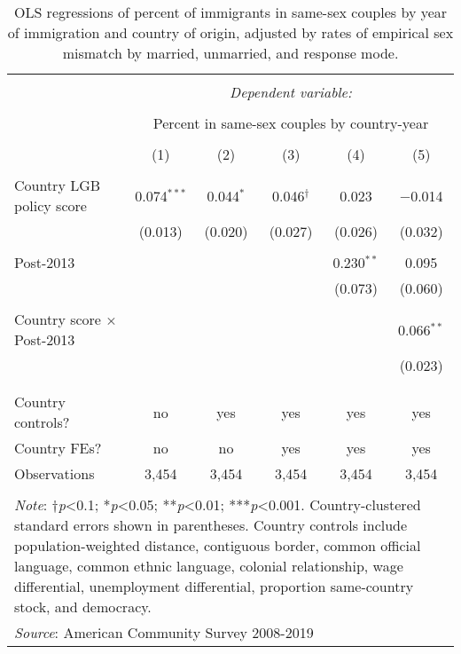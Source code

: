 \documentclass[
  11pt,
]{article}
\begin{document}
\begin{table}[H] \centering 
  \caption{OLS regressions of percent of immigrants in same-sex couples by year of immigration and country of origin, adjusted by rates of empirical sex mismatch by married, unmarried, and response mode. } 
  \label{tab:country-props-adj} 
\begin{tabular}{@{\extracolsep{5pt}}lccccc} 
\\[-1.8ex]\hline 
\hline \\[-1.8ex] 
 & \multicolumn{5}{c}{\textit{Dependent variable:}} \\ 
\cline{2-6} 
\\[-1.8ex] & \multicolumn{5}{c}{Percent in same-sex couples by country-year} \\ 
\\[-1.8ex] & (1) & (2) & (3) & (4) & (5)\\ 
\hline \\[-1.8ex] 
 Country LGB policy score & 0.074$^{***}$ & 0.044$^{*}$ & 0.046$^{†}$ & 0.023 & $-$0.014 \\ 
  & (0.013) & (0.020) & (0.027) & (0.026) & (0.032) \\ 
  & & & & & \\ 
 Post-2013 &  &  &  & 0.230$^{**}$ & 0.095 \\ 
  &  &  &  & (0.073) & (0.060) \\ 
  & & & & & \\ 
 Country score × Post-2013 &  &  &  &  & 0.066$^{**}$ \\ 
  &  &  &  &  & (0.023) \\ 
  & & & & & \\ 
\hline \\[-1.8ex] 
Country controls? & no & yes & yes & yes & yes \\ 
Country FEs? & no & no & yes & yes & yes \\ 
Observations & 3,454 & 3,454 & 3,454 & 3,454 & 3,454 \\ 
\hline 
\hline \\[-1.8ex] 
\multicolumn{6}{l}{\parbox[t]{.8\textwidth}{\textit{Note}: †\textit{p}<0.1; *\textit{p}<0.05; **\textit{p}<0.01; ***\textit{p}<0.001. Country-clustered standard errors shown in parentheses. Country controls include population-weighted distance, contiguous border, common official language, common ethnic language, colonial relationship, wage differential, unemployment differential, proportion same-country stock, and democracy.}} \\ 
\multicolumn{6}{l}{\textit{Source}: American Community Survey 2008-2019} \\ 
\end{tabular} 
\end{table}
\end{document}
